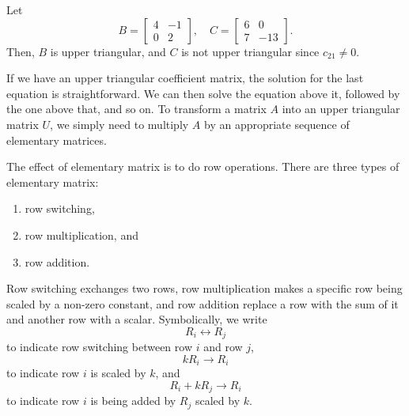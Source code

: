 \documentclass[11pt]{article}
\theoremstyle{break}
\theoremstyle{no_label}
\numberwithin{equation}{section}
\begin{document}
\begin{example}
    Let $$B=\begin{bmatrix}
        4 & -1 \\ 0 & 2
    \end{bmatrix},\quad C=\begin{bmatrix}
        6 & 0 \\ 7 & -13
    \end{bmatrix}.$$ Then, $B$ is upper triangular, and $C$
    is not upper triangular since $c_{21}\ne0$.
\end{example}

If we have an upper triangular coefficient matrix, the solution for the last equation is straightforward. We can then solve the equation above it, followed by the one above that, and so on. To transform a matrix $A$ into an upper triangular matrix $U$, we simply need to multiply $A$ by an appropriate sequence of elementary matrices.

\begin{definition}
    The effect of elementary matrix is to do row operations. There are three types of elementary matrix: \begin{enumerate}
        \item row switching,
        \item row multiplication, and
        \item row addition.
    \end{enumerate}
    Row switching exchanges two rows, row multiplication makes a specific row being scaled by a non-zero constant, and row addition replace a row with the sum of it and another row with a scalar. Symbolically, we write $$R_i\leftrightarrow R_j$$ to indicate row switching between row $i$ and row $j$, $$kR_i\to R_i$$ to indicate row $i$ is scaled by $k$, and $$R_i+kR_j\to R_i$$ to indicate row $i$ is being added by $R_j$ scaled by $k$.
\end{definition}
\end{document}
